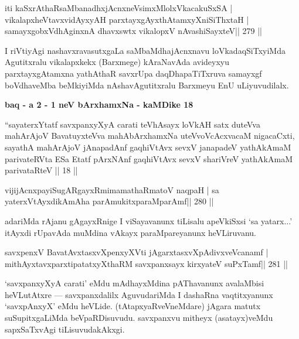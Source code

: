 \begin{shl}
iti kaSxrAthaRsaMbanadhxjAcnxneV\s simxMlolxVkacakuSxSA |
vikalapxheVtavxvidAyxyAH parxtayxgAyxthAtamxyXniSiThxtaH |
samayxgobxVdhAginxnA dhavxswtx vikalopxV nAvashiSayxteV\hfill || 279 ||
\end{shl}

\begin{artha}
I riVtiyAgi nashavxravasutxgaLa saMbaMdhajAcnxnavu loVkadaqSiTxyiMda Agutitxralu vikalapxkekx (Barxmege) kAraNavAda avideyxyu parxtayxgAtamxna yathAthaR savxrUpa daqDhapaTiTxruva samayxgf boVdhaveMba beMkiyiMda nAshavAgutitxralu Barxmeyu EnU uLiyuvudilalx.
\end{artha}


\newpage

\begin{center}
{\large\bf baq - a 2 - 1 neV bArxhamxNa  - kaMDike 18}
\end{center}

\begin{shl}
``sayaterxYtatf savxpanxyXyA carati teVhAsayx loVkAH
satx duteVva mahArAjoV BavatuyxteVva mahAbArxhamxNa
uteVvoVcAcxvacaM nigacaCxti, sayathA mahArAjoV
jAnapadAnf gaqhiVtAvx sevxV janapadeV yathAkAmaM
parivateRVta ESa Etatf pArxNAnf gaqhiVtAvx sevxV
shariVreV yathAkAmaM parivataRteV || 18 ||
\end{shl}

\begin{shl}
vijijAcnxpayiSugARgayxRmimamathaRmatoV naqpaH |
sa yaterxVtAyxdikAmAha parAmukitxparaMparAmf\hfill || 280 ||
\end{shl}

\begin{artha}
adariMda rAjanu gAgayxRnige I viSayavanunx tiLisalu apeVkiSxsi `sa  yatarx...' itAyxdi rUpavAda muMdina vAkayx paraMpareyanunx heVLiruvanu.
\end{artha}

\begin{shl}
savxpenxV BavatAvxtasxvXpenxyXVti jAgarxtasxvXpAdivxveVcanamf |
mithAyxtavxparxtipatatxyXthaRM savxpanxsayx kirxyateV suPxTamf\hfill || 281 ||
\end{shl}

\begin{artha}
`savxpanxyXyA carati' eMdu mAdhayxMdina pAThavanunx avalaMbisi  heVLutAtxre  {\rm ---}  savxpanxdalilx AguvudariMda I dashaRna vaqtitxyanunx  `savxpAnxyX' eMdu heVLide. (tAtapxyaRveVneMdare) jAgara matutx suSupitxgaLiMda beVpaRDisuvudu. savxpanxvu mitheyx (asatayx)veMdu sapxSaTxvAgi tiLisuvudakAkxgi.
\end{artha}

